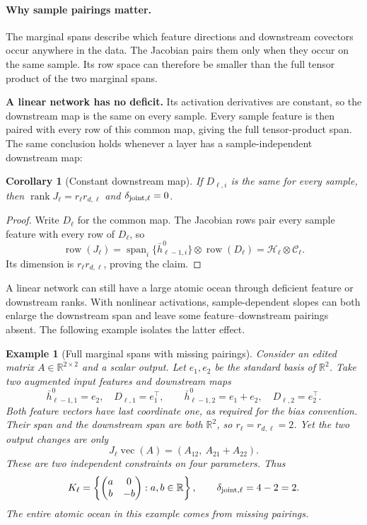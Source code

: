 \documentclass[twoside]{article}
\newtheorem{corollary}[theorem]{Corollary}
\newtheorem{example}[theorem]{Example}
\theoremstyle{remark}
\DeclareMathOperator{\rank}{rank}
\DeclareMathOperator{\spanop}{span}
\newcommand{\R}{\mathbb R}
\newcommand{\cC}{\mathcal C}
\newcommand{\cH}{\mathcal H}
\theoremstyle{highlightdefinition}
\theoremstyle{remark}
\newcommand{\spn}{\spanop}
\begin{document}
\paragraph{Why sample pairings matter.}
The marginal spans describe which feature directions and downstream covectors occur anywhere in the data. The Jacobian pairs them only when they occur on the same sample. Its row space can therefore be smaller than the full tensor product of the two marginal spans.

\textbf{A linear network has no deficit.} Its activation derivatives are constant, so the downstream map is the same on every sample. Every sample feature is then paired with every row of this common map, giving the full tensor-product span. The same conclusion holds whenever a layer has a sample-independent downstream map:
\begin{corollary}[Constant downstream map]
\label{cor:app-constant-downstream}
If $D_{\ell,i}$ is the same for every sample, then $\rank J_\ell=r_\ell r_{d,\ell}$ and $\delta_{\rm joint,\ell}=0$.
\end{corollary}
\begin{proof}
Write $D_\ell$ for the common map. The Jacobian rows pair every sample feature with every row of $D_\ell$, so
\[
 \operatorname{row}(J_\ell)
 =\spn_i\{\bar h_{\ell-1,i}^0\}\otimes\operatorname{row}(D_\ell)
 =\cH_\ell\otimes\cC_\ell.
\]
Its dimension is $r_\ell r_{d,\ell}$, proving the claim.
\end{proof}
A linear network can still have a large atomic ocean through deficient feature or downstream ranks. With nonlinear activations, sample-dependent slopes can both enlarge the downstream span and leave some feature--downstream pairings absent. The following example isolates the latter effect.

\begin{example}[Full marginal spans with missing pairings]
Consider an edited matrix $A\in\R^{2\times2}$ and a scalar output. Let $e_1,e_2$ be the standard basis of $\R^2$. Take two augmented input features and downstream maps
\[
 \bar h_{\ell-1,1}^0=e_2,\quad D_{\ell,1}=e_1^\top,
 \qquad
 \bar h_{\ell-1,2}^0=e_1+e_2,\quad D_{\ell,2}=e_2^\top.
\]
Both feature vectors have last coordinate one, as required for the bias convention. Their span and the downstream span are both $\R^2$, so $r_\ell=r_{d,\ell}=2$. Yet the two output changes are only
\[
 J_\ell\operatorname{vec}(A)=(A_{12},\ A_{21}+A_{22}).
\]
These are two independent constraints on four parameters. Thus
\[
 K_\ell=\left\{\begin{pmatrix}a&0\\b&-b\end{pmatrix}:a,b\in\R\right\},
 \qquad \delta_{\rm joint,\ell}=4-2=2.
\]
The entire atomic ocean in this example comes from missing pairings.
\end{example}
\end{document}
